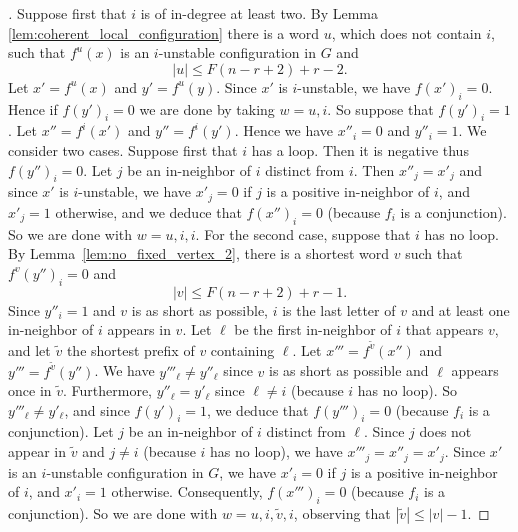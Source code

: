 \documentclass[11pt,letter]{article}
\newcommand{\BF}[1]{{{\boldmath{\bf #1}\unboldmath}}}
\begin{document}
\begin{proof}[{\BF{Proof of Lemma~\ref{lem:fixing_a_vertex}}}]
\medskip
Suppose first that $i$ is of in-degree at least two. By Lemma \ref{lem:coherent_local_configuration} there is a word $u$, which does not contain $i$, such that $f^u(x)$ is an $i$-unstable configuration in $G$ and 
\[
|u|\leq F(n-r+2)+r-2.
\]
Let $x'=f^u(x)$ and $y'=f^u(y)$. Since $x'$ is $i$-unstable, we have $f(x')_i=0$. Hence if $f(y')_i=0$ we are done by taking $w=u,i$. So suppose that $f(y')_i=1$. Let $x''=f^i(x')$ and $y''=f^i(y')$. Hence we have $x''_i=0$ and $y''_i=1$. We consider two cases. Suppose first that $i$ has a loop. Then it is negative thus $f(y'')_i=0$. Let $j$ be an in-neighbor of $i$ distinct from $i$. Then $x''_j=x'_j$ and since $x'$ is $i$-unstable, we have $x'_j=0$ if $j$ is a positive in-neighbor of $i$, and $x'_j=1$ otherwise, and we deduce that $f(x'')_i=0$ (because $f_i$ is a conjunction). So we are done with $w=u,i,i$. For the second case, suppose that $i$ has no loop. By Lemma~\ref{lem:no_fixed_vertex_2}, there is a shortest word $v$  such that $f^v(y'')_i=0$ and 
\[
|v|\leq F(n-r+2)+r-1.
\]
Since $y''_i=1$ and $v$ is as short as possible, $i$ is the last letter of $v$ and at least one in-neighbor of $i$ appears in $v$. Let $\ell$ be the first in-neighbor of $i$ that appears $v$, and let $\tilde v$ the shortest prefix of $v$ containing $\ell$. Let $x'''=f^{\tilde v}(x'')$ and $y'''=f^{\tilde v}(y'')$. We have $y'''_\ell\neq y''_\ell$ since $v$ is as short as possible and $\ell$ appears once in $\tilde v$. Furthermore, $y''_\ell=y'_\ell$ since $\ell\neq i$ (because $i$ has no loop). So $y'''_\ell\neq y'_\ell$, and since $f(y')_i=1$, we deduce that  $f(y''')_i=0$ (because $f_i$ is a conjunction). Let $j$ be an in-neighbor of $i$ distinct from $\ell$. Since $j$ does not appear in $\tilde v$ and $j\neq i$ (because $i$ has no loop), we have $x'''_j=x''_j=x'_j$. Since $x'$ is an $i$-unstable configuration in $G$, we have $x'_i=0$ if $j$ is a positive in-neighbor of $i$, and $x'_i=1$ otherwise. Consequently, $f(x''')_i=0$ (because $f_i$ is a conjunction). So we are done with $w=u,i,\tilde v,i$, observing that $|\tilde v|\leq |v|-1$.  


\end{proof}
\end{document}
